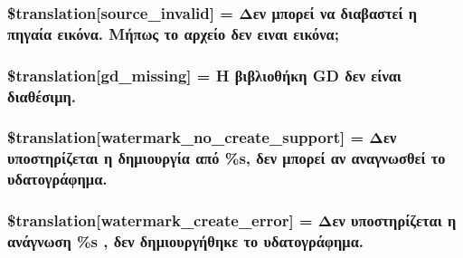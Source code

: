 \subsubsection[{\$translation}]{\setlength{\rightskip}{0pt plus 5cm}\$translation\mbox{[}\textquotesingle{}source\+\_\+invalid\textquotesingle{}\mbox{]} = \textquotesingle{}Δεν μπορεί να διαβαστεί η πηγαία εικόνα. Μήπως το αρχείο δεν ειναι εικόνα;\textquotesingle{}}\label{class_8upload_8el___g_r_8php_a6ab0a660b457eaf2d3434b225449fdd6}
\hypertarget{class_8upload_8el___g_r_8php_a7f3dfcc0db4bbc0f2e7210c439798e56}{}
\subsubsection[{\$translation}]{\setlength{\rightskip}{0pt plus 5cm}\$translation\mbox{[}\textquotesingle{}gd\+\_\+missing\textquotesingle{}\mbox{]} = \textquotesingle{}Η βιβλιοθήκη G\+D δεν είναι διαθέσιμη.\textquotesingle{}}\label{class_8upload_8el___g_r_8php_a7f3dfcc0db4bbc0f2e7210c439798e56}
\hypertarget{class_8upload_8el___g_r_8php_a82d5853430ab72dc1f9799ec36144cc6}{}
\subsubsection[{\$translation}]{\setlength{\rightskip}{0pt plus 5cm}\$translation\mbox{[}\textquotesingle{}watermark\+\_\+no\+\_\+create\+\_\+support\textquotesingle{}\mbox{]} = \textquotesingle{}Δεν υποστηρίζεται η δημιουργία από \%s, δεν μπορεί αν αναγνωσθεί το υδατογράφημα.\textquotesingle{}}\label{class_8upload_8el___g_r_8php_a82d5853430ab72dc1f9799ec36144cc6}
\hypertarget{class_8upload_8el___g_r_8php_aabca0b65dadbc6184415c16375f284ca}{}
\subsubsection[{\$translation}]{\setlength{\rightskip}{0pt plus 5cm}\$translation\mbox{[}\textquotesingle{}watermark\+\_\+create\+\_\+error\textquotesingle{}\mbox{]} = \textquotesingle{}Δεν υποστηρίζεται η ανάγνωση \%s , δεν δημιουργήθηκε το υδατογράφημα.\textquotesingle{}}\label{class_8upload_8el___g_r_8php_aabca0b65dadbc6184415c16375f284ca}
\hypertarget{class_8upload_8el___g_r_8php_ac336e7a5701e47ba4a05e9e498a3cc44}{}
